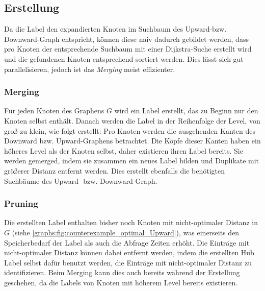 \subsection{Erstellung}

Da die Label den expandierten Knoten im Suchbaum des Upward-bzw. Downward-Graph entspricht, können diese naiv dadurch gebildet werden, dass pro Knoten der entsprechende Suchbaum mit einer Dijkstra-Suche erstellt wird und die gefundenen Knoten entsprechend sortiert werden.
Dies lässt sich gut parallelisieren, jedoch ist das \emph{Merging} meist effizienter.

\subsubsection{Merging}

Für jeden Knoten des Graphens $G$ wird ein Label erstellt, das zu Beginn nur den Knoten selbst enthält.
Danach werden die Label in der Reihenfolge der Level, von groß zu klein, wie folgt erstellt:
Pro Knoten werden die ausgehenden Kanten des Downward bzw. Upward-Graphens betrachtet.
Die Köpfe dieser Kanten haben ein höheres Level als der Knoten selbst, daher existieren ihren Label bereits.
Sie werden gemerged, indem sie zusammen ein neues Label bilden und Duplikate mit größerer Distanz entfernt werden.
Dies erstellt ebenfalls die benötigten Suchbäume des Upward- bzw. Downward-Graph.

\subsubsection{Pruning}

Die erstellten Label enthalten bisher noch Knoten mit nicht-optimaler Distanz in $G$ (siehe \autoref{graphs:fig:counterexample_optimal_Upward}), was einerseits den Speicherbedarf der  Label als auch die Abfrage Zeiten erhöht.
Die Einträge mit nicht-optimaler Distanz können dabei entfernt werden, indem die erstellten Hub Label selbst dafür benutzt werden, die Einträge mit nicht-optimaler Distanz zu identifizieren.
Beim Merging kann dies auch bereits während der Erstellung geschehen, da die Labels von Knoten mit höherem Level bereits existieren.